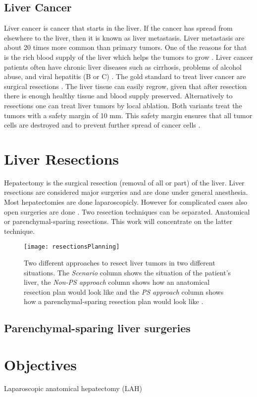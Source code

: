 \subsection{Liver Cancer}
Liver cancer is cancer that starts in the liver. If the cancer has spread from
elsewhere to the liver, then it is known as liver metastasis. Liver metastasis
are about 20 times more common than primary tumors. One of the reasons for that
is the rich blood supply of the liver which helps the tumors to grow
\cite{mcguire2016world}. Liver cancer patients often have chronic liver diseases
such as cirrhosis, problems of alcohol abuse, and viral hepatitis (B or C)
\cite{galun2015hepatocellular}. The gold standard to treat liver cancer are
surgical resections \cite{lencioni2012local}. The liver tissue can easily regrow, given that after resection there is
enough healthy tissue and blood supply preserved. Alternatively to resections
one can treat liver tumors by local ablation. Both variants treat the tumors
with a safety margin of 10 mm. This safety margin ensures that all tumor cells
are destroyed and to prevent further spread of cancer cells \cite{mahnken2009ct}.
\section{Liver Resections} 
Hepatectomy is the surgical resection (removal of all or part) of the liver.
Liver resections are considered major surgeries and are done under general
anesthesia. Most hepatectomies are done laparoscopicly. However for complicated
cases also open surgeries are done \cite{cherqui2000laparoscopic}. Two
resection techniques can be separated. Anatomical or parenchymal-sparing
resections. This work will concentrate on the latter technique.
\begin{figure}[H]
  \centering
 \texttt{[image: resectionsPlanning]}
  \caption{Two different approaches to resect liver tumors in two different
    situations. The \textit{Scenario} column shows the situation of the
    patient's liver, the \textit{Non-PS approach} column shows how an anatomical
  resection plan would look like and the \textit{PS approach} column shows how a
parenchymal-sparing resection plan would look like \cite{alvarez2016parenchymal}.}
  \label{fig:resectionsPlanning}
\end{figure}

\subsection{Parenchymal-sparing liver surgeries}
\cite{alvarez2016parenchymal}
\section{Objectives} 
Laparoscopic anatomical hepatectomy (LAH)

\endinput
